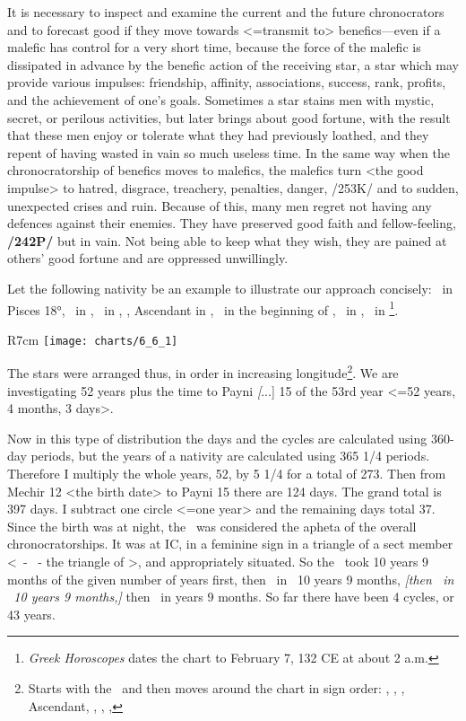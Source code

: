 It is necessary to inspect and examine the current and the future chronocrators and to forecast good if they move towards <=transmit to>  benefics—even if a malefic has control for a very short time, because the force of the malefic is dissipated in advance by the benefic action of the receiving star, a star which may provide various impulses: friendship, affinity, associations, success, rank, profits, and the achievement of one’s goals. Sometimes a star stains men with mystic, secret, or perilous activities, but later brings about good fortune, with the result that these men enjoy or tolerate what they had previously loathed, and they repent of having wasted in vain so much useless time. In the same way when the chronocratorship of benefics moves to  malefics, the malefics turn <the good impulse> to hatred, disgrace, treachery, penalties, danger, /253K/ and to sudden, unexpected crises and ruin. Because of this, many men regret not having any defences against their enemies. They have preserved good faith and fellow-feeling, \textbf{/242P/} but in vain. Not being able to keep what they wish, they are pained at others’ good fortune and are oppressed unwillingly.

\newpage
Let the following nativity be an example to illustrate our approach concisely: \Moon\, in Pisces 18°, \Venus\, in \Aries, \Jupiter\, in \Libra, \Saturn, Ascendant in \Sagittarius, \Mars\, in the beginning of \Aquarius, \Sun\, in \Aquarius, \Mercury\, in \Pisces\footnote{\textit{Greek Horoscopes} dates the chart to February 7, 132 CE at about 2 a.m.}. 

\begin{wrapfigure}[15]{R}{7cm}
\centering
\vspace{-20pt}
\texttt{[image: charts/6\_6\_1]}
\caption{Chart 72 [VI.6.1, GH L132]}
\label{fig:chart72}
\end{wrapfigure}

The stars were arranged thus, in order in increasing longitude\footnote{Starts with the \Moon\, and then moves around the chart in sign order: \Moon, \Venus, \Jupiter, Ascendant, \Saturn, \Mars, \Sun, \Mercury}. We are investigating 52 years plus the time to Payni \textsl[...] 15 of the 53rd year <=52 years, 4 months, 3 days>. 

Now in this type of distribution the days and the cycles are calculated using 360-day periods, but the years of a nativity are calculated using 365 1/4 periods. Therefore I multiply the whole years, 52, by 5 1/4 for a total of 273. Then from Mechir 12 <the birth date> to Payni 15 there are 124 days. The grand total is 397 days. I subtract one circle <=one year> and the remaining days total 37. Since the birth was at night, the \Moon\, was considered the apheta of the overall chronocratorships. It was at IC, in a feminine sign in a triangle of a sect member <\Pisces\, - \Cancer\, - \Scorpio  the triangle of \Venus>, and appropriately situated. So the \Moon\, took 10 years 9 months of the given number of years first, then \Venus\, in \Aries\, 10 years 9 months, \textsl{[then \Jupiter\, in \Libra\, 10 years 9 months,]} then \Saturn\, in  years 9 months. So far there have been 4 cycles, or 43 years.

